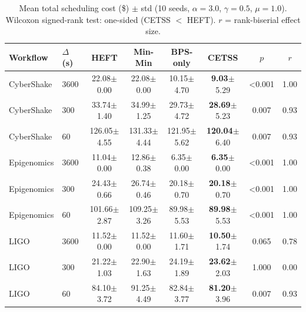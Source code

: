 \begin{table}[t]
\centering
\caption{Mean total scheduling cost (\$) $\pm$ std (10 seeds, $\alpha=3.0$, $\gamma=0.5$, $\mu=1.0$). Wilcoxon signed-rank test: one-sided (CETSS $<$ HEFT). $r$ = rank-biserial effect size.}
\label{tab:main_results}
\begin{tabular}{llcccccc}
\toprule
Workflow & $\Delta$ (s) & HEFT & Min-Min & BPS-only & \textbf{CETSS} & $p$ & $r$ \\
\midrule
CyberShake & 3600 & 22.08$\pm$0.00 & 22.08$\pm$0.00 & 10.15$\pm$4.70 & \textbf{9.03}$\pm$5.29 & <0.001 & 1.00 \\
CyberShake & 300 & 33.74$\pm$1.40 & 34.99$\pm$1.25 & 29.73$\pm$4.72 & \textbf{28.69}$\pm$5.23 & 0.007 & 0.93 \\
CyberShake & 60 & 126.05$\pm$4.55 & 131.33$\pm$4.44 & 121.95$\pm$5.62 & \textbf{120.04}$\pm$6.40 & 0.007 & 0.93 \\
\midrule
Epigenomics & 3600 & 11.04$\pm$0.00 & 12.86$\pm$0.38 & 6.35$\pm$0.00 & \textbf{6.35}$\pm$0.00 & <0.001 & 1.00 \\
Epigenomics & 300 & 24.43$\pm$0.66 & 26.74$\pm$0.46 & 20.18$\pm$0.70 & \textbf{20.18}$\pm$0.70 & <0.001 & 1.00 \\
Epigenomics & 60 & 101.66$\pm$2.87 & 109.25$\pm$3.26 & 89.98$\pm$5.53 & \textbf{89.98}$\pm$5.53 & <0.001 & 1.00 \\
\midrule
LIGO & 3600 & 11.52$\pm$0.00 & 11.52$\pm$0.00 & 11.60$\pm$1.71 & \textbf{10.50}$\pm$1.74 & 0.065 & 0.78 \\
LIGO & 300 & 21.22$\pm$1.03 & 22.90$\pm$1.63 & 24.19$\pm$1.89 & \textbf{23.62}$\pm$2.03 & 1.000 & 0.00 \\
LIGO & 60 & 84.10$\pm$3.72 & 91.25$\pm$4.49 & 82.84$\pm$3.77 & \textbf{81.20}$\pm$3.96 & 0.007 & 0.93 \\
\midrule
\bottomrule
\end{tabular}
\end{table}